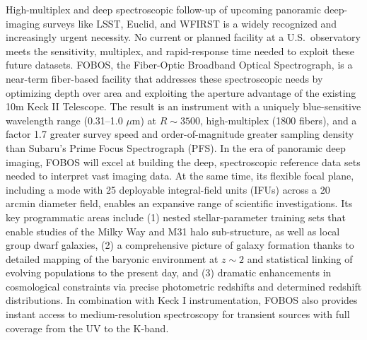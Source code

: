 \documentclass[11pt,a4paper,twoside,onecolumn,openany,final,oldfontcommands]{memoir}
\begin{document}
High-multiplex and deep spectroscopic follow-up of upcoming panoramic deep-imaging surveys like LSST, Euclid, and WFIRST is a widely recognized and increasingly urgent necessity. No current or planned facility at a U.S.~observatory meets the sensitivity, multiplex, and rapid-response time needed to exploit these future datasets. FOBOS, the Fiber-Optic Broadband Optical Spectrograph, is a near-term fiber-based facility that addresses these spectroscopic needs by optimizing depth over area and exploiting the aperture advantage of the existing 10m Keck II Telescope. The result is an instrument with a uniquely blue-sensitive wavelength range (0.31--1.0 $\mu$m) at $R \sim 3500$, high-multiplex (1800 fibers), and a factor 1.7 greater survey speed and order-of-magnitude greater sampling density than Subaru's Prime Focus Spectrograph (PFS). In the era of panoramic deep imaging, FOBOS will excel at building the deep, spectroscopic reference data sets needed to interpret vast imaging data. At the same time, its flexible focal plane, including a mode with 25 deployable integral-field units (IFUs) across a 20 arcmin diameter field, enables an expansive range of scientific investigations. Its key programmatic areas include (1) nested stellar-parameter training sets that enable studies of the Milky Way and M31 halo sub-structure, as well as local group dwarf galaxies, (2) a comprehensive picture of galaxy formation thanks to detailed mapping of the baryonic environment at $z \sim 2$ and statistical linking of evolving populations to the present day, and (3) dramatic enhancements in cosmological constraints via precise photometric redshifts and determined redshift distributions.  In combination with Keck I instrumentation, FOBOS also provides instant access to medium-resolution spectroscopy for transient sources with full coverage from the UV to the K-band.

\end{document}
